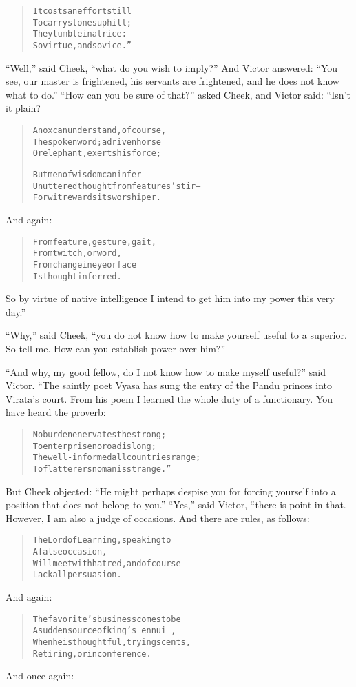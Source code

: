 \documentclass[article, twoside, 14pt]{memoir}
\renewenvironment{verbatim}{%
\begin{quote}%
\vskip -10pt%
\begin{alltt}\normalfont\large}{\end{alltt}%
\end{quote}%
\vskip -10pt
} %
\begin{document}
\begin{verbatim}
It costs an effort still
To carry stones uphill;
They tumble in a trice:
So virtue, and so vice.”
\end{verbatim}
``Well,'' said Cheek, ``what do you wish to imply?'' And Victor
answered:
``You see, our master is frightened, his servants are frightened, and he does not know what to do.''
``How can you be sure of that?'' asked Cheek, and Victor said:
“Isn't it plain?

\begin{verbatim}
An ox can understand, of course,
The spoken word; a driven horse
Or elephant, exerts his force;

But men of wisdom can infer
Unuttered thought from features' stir--
For wit rewards its worshiper.
\end{verbatim}
And again:

\begin{verbatim}
From feature, gesture, gait,
    From twitch, or word,
From change in eye or face
    Is thought inferred.
\end{verbatim}
So by virtue of native intelligence I intend to get him into my
power this very day.”

``Why,'' said Cheek,
``you do not know how to make yourself useful to a superior. So tell me. How can you establish power over him?''

``And why, my good fellow, do I not know how to make myself useful?''
said Victor. “The saintly poet Vyasa has sung the entry of the
Pandu princes into Virata's court. From his poem I learned the
whole duty of a functionary. You have heard the proverb:

\begin{verbatim}
No burden enervates the strong;
To enterprise no road is long;
The well-informed all countries range;
To flatterers no man is strange.”
\end{verbatim}
But Cheek objected:
``He might perhaps despise you for forcing yourself into a position that does not belong to you.''
``Yes,'' said Victor, “there is point in that. However, I am also a
judge of occasions. And there are rules, as follows:

\begin{verbatim}
The Lord of Learning, speaking to
    A false occasion,
Will meet with hatred, and of course
    Lack all persuasion.
\end{verbatim}
And again:

\begin{verbatim}
The favorite's business comes to be
A sudden source of king's _ennui_,
When he is thoughtful, trying scents,
Retiring, or in conference.
\end{verbatim}
And once again:
\end{document}
